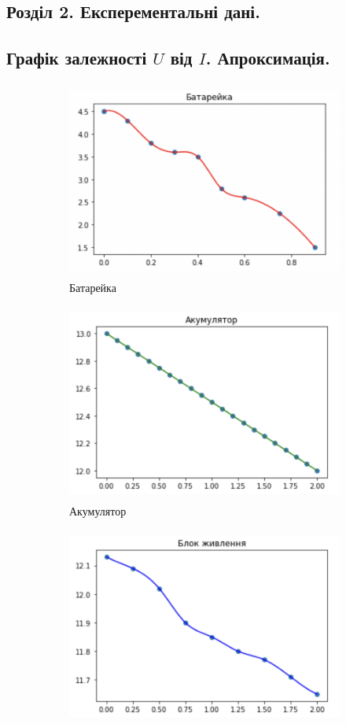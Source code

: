 \documentclass[a4paper,12pt]{article}
\begin{document}
\begin{justify}
	\section{Розділ 2. Експерементальні дані.}
	\subsection{Графік залежності $U$ від $I$. Апроксимація.}
	\begin{figure}[!h]
		\centering
		\begin{subfigure}{0.6\linewidth}
			\includegraphics[height=65mm]{media/graph5aa.png}
    		\caption{Батарейка}
			\label{fig:5a}
    	\end{subfigure}\hfill
    	\begin{subfigure}{0.6\linewidth}
			\includegraphics[height=65mm]{media/graph5bb.png}
    		\caption{Акумулятор}
			\label{fig:5b}
    	\end{subfigure}\hfill
    	\begin{subfigure}{0.6\linewidth}
			\includegraphics[height=65mm]{media/graph5cc.png}

\end{subfigure}
\end{figure}
\end{justify}
\end{document}
